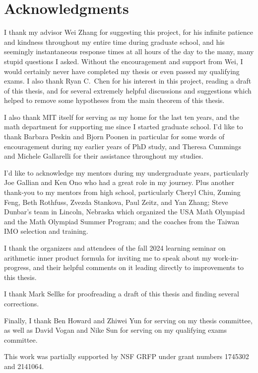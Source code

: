 

\chapter*{Acknowledgments}

I thank my advisor Wei Zhang for suggesting this project,
for his infinite patience and kindness throughout my entire time during graduate school,
and his seemingly instantaneous response times at all hours of the day
to the many, many stupid questions I asked.
Without the encouragement and support from Wei,
I would certainly never have completed my thesis or even passed my qualifying exams.
I also thank Ryan C.~Chen for his interest in this project,
reading a draft of this thesis, and for several extremely helpful discussions and suggestions
which helped to remove some hypotheses from the main theorem of this thesis.

I also thank MIT itself for serving as my home for the last ten years,
and the math department for supporting me since I started graduate school.
I'd like to thank Barbara Peskin and Bjorn Poonen in particular
for some words of encouragement during my earlier years of PhD study,
and Theresa Cummings and Michele Gallarelli for their assistance throughout my studies.

I'd like to acknowledge my mentors during my undergraduate years,
particularly Joe Gallian and Ken Ono who had a great role in my journey.
Plus another thank-you to my mentors from high school, particularly
Cheryl Chiu, Zuming Feng, Beth Rothfuss, Zvezda Stankova, Paul Zeitz, and Yan Zhang;
Steve Dunbar's team in Lincoln, Nebraska which organized the USA Math Olympiad
and the Math Olympiad Summer Program;
and the coaches from the Taiwan IMO selection and training.

I thank the organizers and attendees of the fall 2024
learning seminar on arithmetic inner product formula
for inviting me to speak about my work-in-progress, and their helpful comments on it
leading directly to improvements to this thesis.

I thank Mark Sellke for proofreading a draft of this thesis
and finding several corrections.

Finally, I thank Ben Howard and Zhiwei Yun for serving on my thesis committee,
as well as David Vogan and Nike Sun for serving on my qualifying exams committee.

This work was partially supported by NSF GRFP under grant numbers 1745302 and 2141064.
